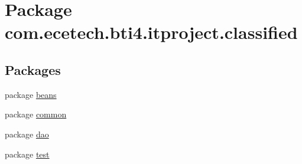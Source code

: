 \hypertarget{namespacecom_1_1ecetech_1_1bti4_1_1itproject_1_1classified}{}\section{Package com.\+ecetech.\+bti4.\+itproject.\+classified}
\label{namespacecom_1_1ecetech_1_1bti4_1_1itproject_1_1classified}
\subsection*{Packages}
\begin{DoxyCompactItemize}
\item 
package \hyperlink{namespacecom_1_1ecetech_1_1bti4_1_1itproject_1_1classified_1_1beans}{beans}
\item 
package \hyperlink{namespacecom_1_1ecetech_1_1bti4_1_1itproject_1_1classified_1_1common}{common}
\item 
package \hyperlink{namespacecom_1_1ecetech_1_1bti4_1_1itproject_1_1classified_1_1dao}{dao}
\item 
package \hyperlink{namespacecom_1_1ecetech_1_1bti4_1_1itproject_1_1classified_1_1test}{test}
\end{DoxyCompactItemize}
